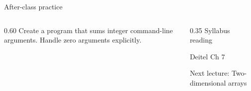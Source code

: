 \documentclass[10pt,aspectratio=169]{beamer}
\begin{document}
\begin{frame}[fragile,t]{After-class practice}
\begin{columns}[T,onlytextwidth]\begin{column}{0.60\textwidth}
Create a program that sums integer command-line arguments. Handle zero arguments explicitly.
\end{column}\begin{column}{0.35\textwidth}\small
Syllabus reading\par Deitel Ch 7

Next lecture: Two-dimensional arrays
\end{column}\end{columns}
\end{frame}
\end{document}
